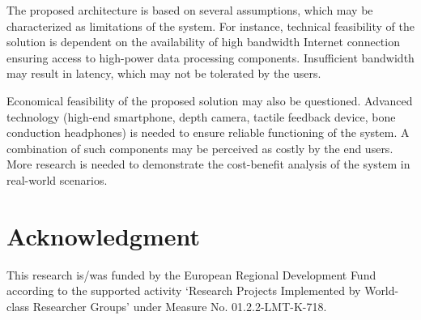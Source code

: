 \documentclass[10pt,conference,compsocconf]{IEEEtran}
\begin{document}
The proposed architecture is based on several assumptions, which may be characterized as limitations of the system. For instance, technical feasibility of the solution is dependent on the availability of high bandwidth Internet connection ensuring access to high-power data processing components. Insufficient bandwidth may result in latency, which may not be tolerated by the users.  

Economical feasibility of the proposed solution may also be questioned. Advanced technology (high-end smartphone, depth camera, tactile feedback device, bone conduction headphones) is needed to ensure reliable functioning of the system. A combination of such components may be perceived as costly by the end users. More research is needed to demonstrate the cost-benefit analysis of the system in real-world scenarios. 

\section*{Acknowledgment}
This research is/was funded by the European Regional Development Fund according to the supported activity ‘Research Projects Implemented by World-class Researcher Groups’ under Measure No. 01.2.2-LMT-K-718.








%
%
%
%
%
\end{document}
